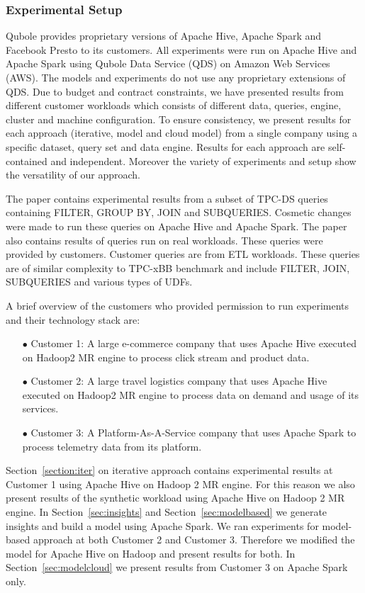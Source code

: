 \noindent\subsubsection*{Experimental Setup}
Qubole\cite{qubole} provides proprietary versions of Apache Hive\cite{thusoo2009hive}, Apache Spark\cite{zaharia2016apache} and Facebook Presto\cite{presto} to its customers.
All experiments were run on Apache Hive and Apache Spark using Qubole Data Service (QDS) on Amazon Web Services (AWS). 
The models and experiments do not use any proprietary extensions of QDS.  
Due to budget and contract constraints, we have presented results from different customer workloads which consists of different data, queries, engine, cluster and machine configuration.
To ensure consistency, we present results for each approach (iterative, model and cloud model) from a single company using a specific dataset, query set and data engine. 
Results for each approach are self-contained and independent. Moreover the variety of experiments and setup show the versatility of our approach. 

The paper contains experimental results from a subset of TPC-DS\cite{poess2002tpc} queries containing FILTER, GROUP BY, JOIN and SUBQUERIES. Cosmetic changes were made to run these
queries on Apache Hive and Apache Spark. The paper also contains results of queries run on real workloads. These queries were provided by customers. Customer queries
are from ETL workloads. These queries are of similar complexity to TPC-xBB benchmark\cite{nambiar2014benchmarking} and include FILTER, JOIN, SUBQUERIES and various types of UDFs.

A brief overview of the customers who provided permission to run experiments and their technology stack are:
\begin{enumerate}
	\item[$\bullet$] Customer 1: A large e-commerce company that uses Apache Hive executed on Hadoop2 MR engine to process click stream and product data. 
	\item[$\bullet$] Customer 2: A large travel logistics company that uses Apache Hive executed on Hadoop2 MR engine to process data on demand and usage of its services.
	\item[$\bullet$] Customer 3: A Platform-As-A-Service company that uses Apache Spark to process telemetry data from its platform.
\end{enumerate}

Section~\ref{section:iter} on iterative approach contains experimental results at Customer 1 using Apache Hive on Hadoop 2 MR engine. 
For this reason we also present results of the synthetic workload using Apache Hive on Hadoop 2 MR engine. 
In Section~\ref{sec:insights} and Section~\ref{sec:modelbased} we generate insights and build a model using Apache Spark. 
We ran experiments for model-based approach at both Customer 2 and Customer 3. 
Therefore we modified the model for Apache Hive on Hadoop and present results for both. In Section~\ref{sec:modelcloud} we present results from Customer 3 on Apache Spark only.   
